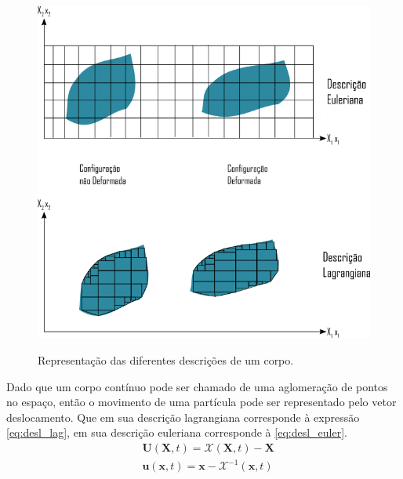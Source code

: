 \begin{figure}[H]
    \centering
    \caption{Representação das diferentes descrições de um corpo.}
    \includegraphics[width=0.8\linewidth]{images/EulervsLagrange.png}
    \label{fig:Euler_Lagrange}
\end{figure}


Dado que um corpo contínuo pode ser chamado de uma aglomeração de pontos no espaço, então o movimento de uma partícula pode ser representado pelo vetor deslocamento. Que em sua descrição lagrangiana corresponde à expressão \ref{eq:desl_lag}, em sua descrição euleriana corresponde à \ref{eq:desl_euler}.
\begin{align}
&\boldsymbol{U}(\boldsymbol{X},t) = \mathcal{X}(\boldsymbol{X},t) - \boldsymbol{X}
\label{eq:desl_lag}\\
&\boldsymbol{u}(\boldsymbol{x},t) = \boldsymbol{x} - \mathcal{X}^{-1}(\boldsymbol{x},t)
\label{eq:desl_euler}
\end{align}

